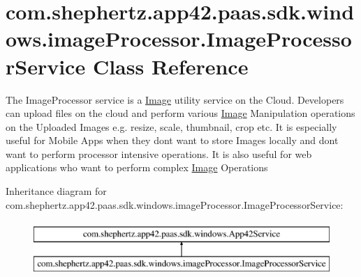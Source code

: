 \hypertarget{classcom_1_1shephertz_1_1app42_1_1paas_1_1sdk_1_1windows_1_1image_processor_1_1_image_processor_service}{\section{com.\+shephertz.\+app42.\+paas.\+sdk.\+windows.\+image\+Processor.\+Image\+Processor\+Service Class Reference}
\label{classcom_1_1shephertz_1_1app42_1_1paas_1_1sdk_1_1windows_1_1image_processor_1_1_image_processor_service}
}


The Image\+Processor service is a \hyperlink{classcom_1_1shephertz_1_1app42_1_1paas_1_1sdk_1_1windows_1_1image_processor_1_1_image}{Image} utility service on the Cloud. Developers can upload files on the cloud and perform various \hyperlink{classcom_1_1shephertz_1_1app42_1_1paas_1_1sdk_1_1windows_1_1image_processor_1_1_image}{Image} Manipulation operations on the Uploaded Images e.\+g. resize, scale, thumbnail, crop etc. It is especially useful for Mobile Apps when they dont want to store Images locally and dont want to perform processor intensive operations. It is also useful for web applications who want to perform complex \hyperlink{classcom_1_1shephertz_1_1app42_1_1paas_1_1sdk_1_1windows_1_1image_processor_1_1_image}{Image} Operations  


Inheritance diagram for com.\+shephertz.\+app42.\+paas.\+sdk.\+windows.\+image\+Processor.\+Image\+Processor\+Service\+:\begin{figure}[H]
\begin{center}
\leavevmode
\includegraphics[height=2.000000cm]{classcom_1_1shephertz_1_1app42_1_1paas_1_1sdk_1_1windows_1_1image_processor_1_1_image_processor_service}
\end{center}
\end{figure}
